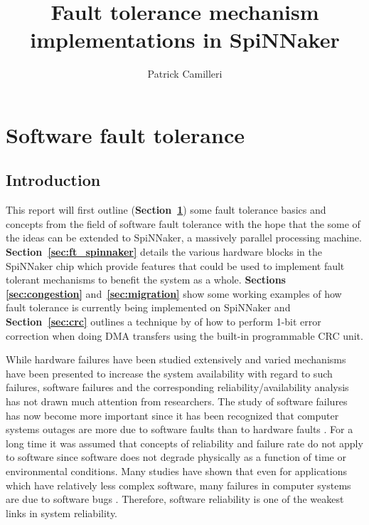 \documentclass[a4paper, 11pt]{article}
\title{Fault tolerance mechanism implementations in SpiNNaker}
\author{Patrick Camilleri}
\date{}
\begin{document}
\maketitle

\tableofcontents

\newpage
\section{Software fault tolerance}
\label{sec:software_ft}

\subsection{Introduction}
This report will first outline (\textbf{Section~\ref{sec:software_ft}}) some fault tolerance basics and concepts from the field of software fault tolerance \citep{trivedi2008software} with the hope that the some of the ideas can be extended to SpiNNaker, a massively parallel processing machine. \textbf{Section~\ref{sec:ft_spinnaker}} details the various hardware blocks in the SpiNNaker chip which provide features that could be used to implement fault tolerant mechanisms to benefit the system as a whole. \textbf{Sections \ref{sec:congestion}} and~\textbf{\ref{sec:migration}} show some working examples of how fault tolerance is currently being implemented on SpiNNaker and \textbf{Section~\ref{sec:crc}} outlines a technique by \citet{grymel2013error} of how to perform 1-bit error correction when doing DMA transfers using the built-in programmable CRC unit.

While hardware failures have been studied extensively and varied mechanisms have been presented to increase the system availability with regard to such failures, software failures and the corresponding reliability/availability analysis has not drawn much attention from researchers. The study of software failures has now become more important since it has been recognized that computer systems outages are more due to software faults than to hardware faults \citep{gray1991high}. For a long time it was assumed that concepts of reliability and failure rate do not apply to software since software does not degrade physically as a function of time or environmental conditions. Many studies have shown that even for applications which have relatively less complex software, many failures in computer systems are due to software bugs \citep{pradhan1996fault}. Therefore, software reliability is one of the weakest links in system reliability.
\end{document}
